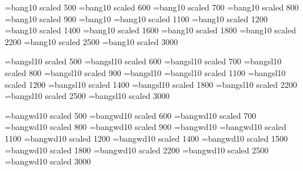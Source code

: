 \font\bngv=bang10 scaled 500
\font\bngvi=bang10 scaled 600
\font\bngvii=bang10 scaled 700
\font\bngviii=bang10 scaled 800
\font\bngix=bang10 scaled 900
\font\bngx=bang10
\font\bngxi=bang10 scaled 1100
\font\bngxii=bang10 scaled 1200
\font\bngxiv=bang10 scaled 1400
\font\bngxvi=bang10 scaled 1600
\font\bngxviii=bang10 scaled 1800
\font\bngxxii=bang10 scaled 2200
\font\bngxxv=bang10 scaled 2500
\font\bngxxx=bang10 scaled 3000

\font\bnsv=bangsl10 scaled 500
\font\bnsvi=bangsl10 scaled 600
\font\bnsvii=bangsl10 scaled 700
\font\bnsviii=bangsl10 scaled 800
\font\bnsix=bangsl10 scaled 900
\font\bnsx=bangsl10
\font\bnsxi=bangsl10 scaled 1100
\font\bnsxii=bangsl10 scaled 1200
\font\bnsxiv=bangsl10 scaled 1400
\font\bnsxviii=bangsl10 scaled 1800
\font\bnsxxii=bangsl10 scaled 2200
\font\bnsxxv=bangsl10 scaled 2500
\font\bnsxxx=bangsl10 scaled 3000

\font\bnwv=bangwd10 scaled 500
\font\bnwvi=bangwd10 scaled 600
\font\bnwvii=bangwd10 scaled 700
\font\bnwviii=bangwd10 scaled 800
\font\bnwix=bangwd10 scaled 900
\font\bnwx=bangwd10
\font\bnwxi=bangwd10 scaled 1100
\font\bnwxii=bangwd10 scaled 1200
\font\bnwxiv=bangwd10 scaled 1400
\font\bnwxv=bangwd10 scaled 1500
\font\bnwxviii=bangwd10 scaled 1800
\font\bnwxxii=bangwd10 scaled 2200
\font\bnwxxv=bangwd10 scaled 2500
\font\bnwxxx=bangwd10 scaled 3000


